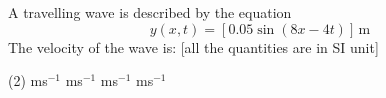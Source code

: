 \item A travelling wave is described by the equation
\[ y(x,t) = [0.05 \sin (8x - 4t)] \, \text{m} \]
The velocity of the wave is: [all the quantities are in SI unit]
\begin{tasks}(2)
     ms\(^{-1}\)
     ms\(^{-1}\)
     ms\(^{-1}\)
     ms\(^{-1}\)
\end{tasks}